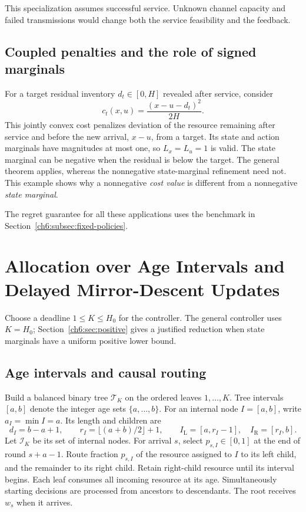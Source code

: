 \documentclass[11pt]{article}
\theoremstyle{plain}
\theoremstyle{remark}
\numberwithin{equation}{section}
\begin{document}
This specialization assumes successful service. Unknown channel capacity
and failed transmissions would change both the service feasibility and
the feedback.

\subsection{Coupled penalties and the role of signed marginals}
\label{ch6:subsec:coupled-penalties}

For a
target residual inventory $d_t\in[0,H]$ revealed after service, consider
\[
 c_t(x,u)=\frac{(x-u-d_t)^2}{2H}.
\]
This jointly convex cost penalizes deviation of the resource remaining after service and before the new arrival,
$x-u$, from a target. Its state and action marginals have magnitudes at
most one, so $L_x=L_u=1$ is valid. The state marginal can be negative when
the residual is below the target. The general theorem applies, whereas the
nonnegative
state-marginal refinement need not. This example shows why a nonnegative
\emph{cost value} is different from a nonnegative \emph{state marginal}.

The regret guarantee for all these applications uses the benchmark in
Section~\ref{ch6:subsec:fixed-policies}.

\section{Allocation over Age Intervals and Delayed Mirror-Descent Updates}
\label{ch6:sec:algorithm}
Choose a deadline $1\le K\le H_0$ for the controller. The general controller uses
$K=H_0$; Section~\ref{ch6:sec:positive} gives a justified reduction when
state marginals have a uniform positive lower bound.

\subsection{Age intervals and causal routing}
Build a balanced binary tree $\mathcal{T}_K$ on the ordered leaves $1,\ldots,K$.
Tree intervals $[a,b]$ denote the integer age sets $\{a,\ldots,b\}$.
For an internal node $I=[a,b]$, write $a_I=\min I=a$. Its length
and children are
\begin{equation}\label{ch6:eq:tree-def}
 d_I=b-a+1,\qquad r_I=\lfloor(a+b)/2\rfloor+1,\qquad
 I_{\mathrm{L}}=[a,r_I-1],\quad I_{\mathrm{R}}=[r_I,b].
\end{equation}
Let $\mathcal{I}_K$ be its set of internal nodes.
For arrival $s$, select $p_{s,I}\in[0,1]$ at the end of round $s+a-1$.
Route fraction $p_{s,I}$ of the resource assigned to $I$ to its left child,
and the remainder to its right child. Retain right-child resource until
its interval begins. Each leaf consumes all incoming resource at its age.
Simultaneously starting decisions are processed from ancestors to descendants.
The root receives $w_s$ when it arrives.
\end{document}
